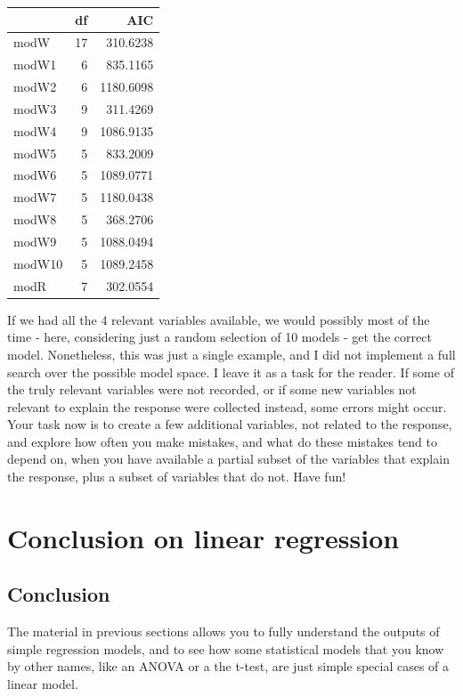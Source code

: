 \documentclass[
]{book}
\begin{document}
\begin{tabular}{l|r|r}
\hline
  & df & AIC\\
\hline
modW & 17 & 310.6238\\
\hline
modW1 & 6 & 835.1165\\
\hline
modW2 & 6 & 1180.6098\\
\hline
modW3 & 9 & 311.4269\\
\hline
modW4 & 9 & 1086.9135\\
\hline
modW5 & 5 & 833.2009\\
\hline
modW6 & 5 & 1089.0771\\
\hline
modW7 & 5 & 1180.0438\\
\hline
modW8 & 5 & 368.2706\\
\hline
modW9 & 5 & 1088.0494\\
\hline
modW10 & 5 & 1089.2458\\
\hline
modR & 7 & 302.0554\\
\hline
\end{tabular}

If we had all the 4 relevant variables available, we would possibly most of the time - here, considering just a random selection of 10 models - get the correct model. Nonetheless, this was just a single example, and I did not implement a full search over the possible model space. I leave it as a task for the reader. If some of the truly relevant variables were not recorded, or if some new variables not relevant to explain the response were collected instead, some errors might occur. Your task now is to create a few additional variables, not related to the response, and explore how often you make mistakes, and what do these mistakes tend to depend on, when you have available a partial subset of the variables that explain the response, plus a subset of variables that do not. Have fun!

\hypertarget{conclusion-on-linear-regression}{%
\section{Conclusion on linear regression}\label{conclusion-on-linear-regression}}

\hypertarget{conclusion}{%
\subsection{Conclusion}\label{conclusion}}

The material in previous sections allows you to fully understand the outputs of simple regression models, and to see how some statistical models that you know by other names, like an ANOVA or a the t-test, are just simple special cases of a linear model.
\end{document}
